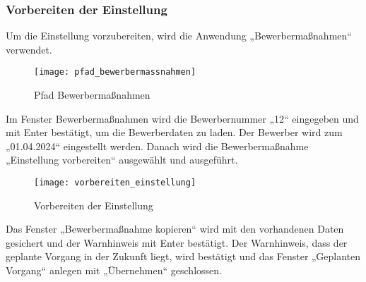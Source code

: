 \subsubsection{Vorbereiten der Einstellung}
Um die Einstellung vorzubereiten, wird die Anwendung „Bewerbermaßnahmen“ verwendet.
\begin{figure}[H]
	\centering
	\texttt{[image: pfad\_bewerbermassnahmen]}
	\caption{Pfad Bewerbermaßnahmen}
	\label{fig:pfad_bewerbermassnahmen}
\end{figure}
Im Fenster Bewerbermaßnahmen wird die Bewerbernummer „12“ eingegeben und mit Enter bestätigt, um die Bewerberdaten zu laden. Der Bewerber wird zum „01.04.2024“ eingestellt werden. Danach wird die Bewerbermaßnahme „Einstellung vorbereiten“ ausgewählt und ausgeführt.
\begin{figure}[H]
	\centering
	\texttt{[image: vorbereiten\_einstellung]}
	\caption{Vorbereiten der Einstellung}
	\label{fig:vorbereiten_einstellung}
\end{figure}
Das Fenster „Bewerbermaßnahme kopieren“ wird mit den vorhandenen Daten gesichert und der Warnhinweis mit Enter bestätigt. Der Warnhinweis, dass der geplante Vorgang in der Zukunft liegt, wird bestätigt und das Fenster „Geplanten Vorgang“ anlegen mit „Übernehmen“ geschlossen.

